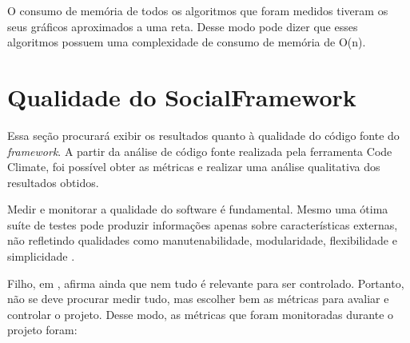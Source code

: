 O consumo de memória de todos os algoritmos que foram medidos tiveram os seus gráficos aproximados a uma reta. Desse modo pode dizer que esses algoritmos possuem uma complexidade de consumo de memória de O(n).

\section{Qualidade do SocialFramework}

Essa seção procurará exibir os resultados quanto à qualidade do código fonte do \textit{framework}. A partir da análise de código fonte realizada pela ferramenta Code Climate, foi possível obter as métricas e realizar uma análise qualitativa dos resultados obtidos.

Medir e monitorar a qualidade do software é fundamental. Mesmo uma ótima suíte de testes pode produzir informações apenas sobre características externas, não refletindo qualidades como manutenabilidade, modularidade, flexibilidade e simplicidade \cite{Filho:2013}.

Filho, em \cite{Filho:2013}, afirma ainda que nem tudo é relevante para ser controlado. Portanto, não se deve procurar medir tudo, mas escolher bem as métricas para avaliar e controlar o projeto. Desse modo, as métricas que foram monitoradas durante o projeto foram:

